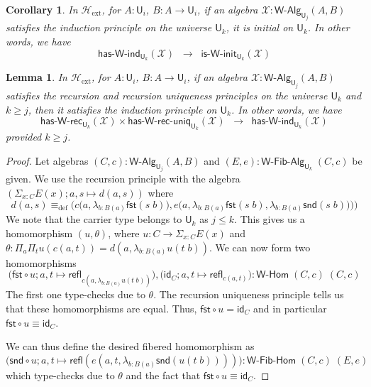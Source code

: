 \documentclass[reqno,10pt,a4paper,oneside]{amsart}
\numberwithin{equation}{section}
\theoremstyle{mythm}
\newtheorem{lemma}[theorem]{Lemma}
\newtheorem{corollary}[theorem]{Corollary}
\theoremstyle{mydef}
\theoremstyle{myrmk}
\newcommand{\deq}{\equiv}
\newcommand{\defeq}{\deq_{\mathrm{def}}}
\newcommand{\idfun}[1]{\mathsf{id}_{#1}}
\newcommand{\comp}{\circ}
\newcommand{\Hext}{\mathcal{H}_{\mathrm{ext}}}
\newcommand{\prd}[1]{\Pi_{#1}}
\newcommand{\sm}[1]{\Sigma_{#1}}
\newcommand{\lam}[1]{\lambda_{#1}}
\newcommand{\fst}{\mathsf{fst}}
\newcommand{\snd}{\mathsf{snd}}
\newcommand{\refl}{\mathsf{refl}}
\newcommand{\W}{\mathsf{W}}
\newcommand{\UU}{\mathsf{U}}
\newcommand{\WAlg}{\mathsf{W}\text{-}\mathsf{Alg}}
\newcommand{\WFibAlg}{\mathsf{W}\text{-}\mathsf{Fib}\text{-}\mathsf{Alg}}
\newcommand{\WHom}{\mathsf{W}\text{-}\mathsf{Hom}}
\newcommand{\WFibHom}{\mathsf{W}\text{-}\mathsf{Fib}\text{-}\mathsf{Hom}}
\newcommand{\HasWRec}{\mathsf{has}\text{-}\mathsf{W}\text{-}\mathsf{rec}}
\newcommand{\HasWInd}{\mathsf{has}\text{-}\mathsf{W}\text{-}\mathsf{ind}}
\newcommand{\HasWRecUniq}{\mathsf{has}\text{-}\mathsf{W}\text{-}\mathsf{rec}\text{-}\mathsf{uniq}}
\newcommand{\IsWInit}{\mathsf{is}\text{-}\mathsf{\W}\text{-}\mathsf{init}}
\newcommand{\X}{\mathcal{X}}
\begin{document}

\begin{corollary}\label{lem:WIndImpInit}
In $\Hext$, for $A:\UU_i$, $B : A \to \UU_i$, if an algebra $\X : \WAlg_{\UU_j}(A,B)$ satisfies the induction principle on the universe $\UU_k$, it is initial on $\UU_k$. In other words, we have
\[ \HasWInd_{\UU_k}(\X) \;\; \rightarrow \;\; \IsWInit_{\UU_k}(\X) \]
\end{corollary}

\begin{lemma}\label{lem:WRecUniqImpInd}
In $\Hext$, for $A:\UU_i$, $B : A \to \UU_i$, if an algebra $\X : \WAlg_{\UU_j}(A,B)$ satisfies the recursion and recursion uniqueness principles on the universe $\UU_k$ and $k \geq j$, then it satisfies the induction principle on $\UU_k$. In other words, we have
\[ \HasWRec_{\UU_k}(\X) \times \HasWRecUniq_{\UU_k}(\X) \;\; \rightarrow \; \; \HasWInd_{\UU_k}(\X) \]
provided $k \geq j$.
\end{lemma}
\begin{proof}
Let algebras $(C,c) : \WAlg_{\UU_j}(A,B)$ and $(E,e) : \WFibAlg_{\UU_k} \; (C,c)$ be given. 
We use the recursion principle with the algebra $(\sm{x:C} E(x); a,s \mapsto d(a,s))$ where
\[ d(a,s) \defeq \Big(c\big(a,\lam{b:B(a)} \fst(s\;b)\big), e\big(a, \lam{b:B(a)} \fst(s\;b), \lam{b:B(a)} \snd(s\;b)\big) \Big) \big) \]
We note that the carrier type belongs to $\UU_k$ as $j \leq k$. This gives us a homomorphism $(u,\theta)$, where $u : C \to \sm{x:C} E(x)$ and $\theta : \prd{a}\prd{t} u(c(a,t)) = d(a,\lam{b:B(a)}u(t\;b))$. We can now form two homomorphisms 
\[\big(\fst \comp u; a,t \mapsto \refl_{c(a,\lam{b:B(a)}u(t\;b))}\big), \big(\idfun{C}; a,t \mapsto \refl_{c(a,t)}\big) : \WHom \; (C,c) \; (C,c)\] The first one type-checks due to $\theta$. The recursion uniqueness principle tells us that these homomorphisms are equal. Thus, $\fst \comp u = \idfun{C}$ and in particular $\fst \comp u \equiv \idfun{C}$. 

We can thus define the desired fibered homomorphism as \[\big(\snd \comp u; a,t \mapsto \refl(e(a,t,\lam{b:B(a)}\snd(u(t\;b))))\big) : \WFibHom \; (C,c) \; (E,e)\]
which type-checks due to $\theta$ and the fact that $\fst \comp u \equiv \idfun{C}$.
\end{proof}
\end{document}
